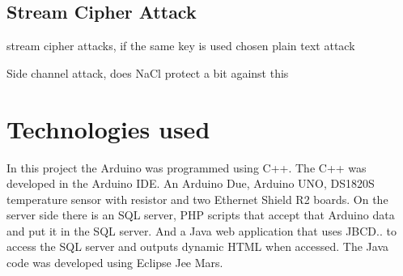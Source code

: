 \subsection{Stream Cipher Attack}

stream cipher attacks, if the same key is used
chosen plain text attack

Side channel attack, does NaCl protect a bit against this

\section{Technologies used}

In this project the Arduino was programmed using C++. The C++ was developed in the Arduino IDE. An Arduino Due, Arduino UNO, DS1820S temperature sensor with resistor and two Ethernet Shield R2 boards. On the server side there is an SQL server, PHP scripts that accept that Arduino data and put it in the SQL server. And a Java web application that uses JBCD.. to access the SQL server and outputs dynamic HTML when accessed. The Java code was developed using Eclipse Jee Mars.
